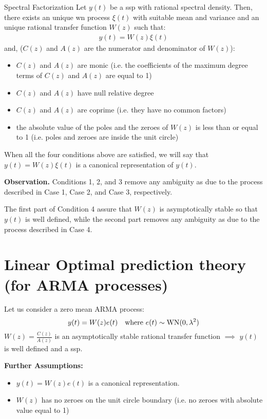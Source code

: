 
\begin{theorem}{Spectral Factorization}
	Let $y(t)$ be a \gls{ssp} with rational spectral density. 
	Then, there exists an unique \gls{wn} process $\xi(t)$ with suitable mean and variance and an unique rational transfer function $W(z)$ such that:
	\begin{align*}
		y(t) = W(z)\xi(t)
	\end{align*}
    and, ($C(z)$ and $A(z)$ are the numerator and denominator of $W(z)$):
    \begin{itemize}
		\item $C(z)$ and $A(z)$ are monic (i.e. the coefficients of the maximum degree terms of $C(z)$ and $A(z)$ are equal to 1)
		\item $C(z)$ and $A(z)$ have null relative degree
		\item $C(z)$ and $A(z)$ are coprime (i.e. they have no common factors) 
		\item the absolute value of the poles and the zeroes of $W(z)$ is less than or equal to 1 (i.e. poles and zeroes are inside the unit circle)
    \end{itemize}
\end{theorem}

When all the four conditions above are satisfied, we will say that $y(t) = W(z)\xi(t)$ is a canonical representation of $y(t)$.

\textbf{Observation.} Conditions 1, 2, and 3 remove any ambiguity as due to the process described in Case 1, Case 2, and Case 3, respectively. 

The first part of Condition 4 assure that $W(z)$ is asymptotically stable so that $y(t)$ is well defined, while the second part removes any ambiguity as due to the process described in Case 4.


\section{Linear Optimal prediction theory (for ARMA processes) }
Let us consider a zero mean ARMA process:
\[
	y(t)=W(z)e(t) \quad \text{where }e(t)\sim \operatorname{WN}(0,\lambda^{2} )
\]
$W(z)=\frac{C(z)}{A(z)}$ is an asymptotically stable rational transfer function $\implies$ $y(t)$ is well defined and a \gls{ssp}.

\textbf{Further Assumptions:}
\begin{itemize}
	\item $y(t) =W(z)e(t)$ is a canonical representation.
	\item $W(z)$ has no zeroes on the unit circle boundary (i.e. no zeroes with absolute value equal to 1)
\end{itemize}
 
